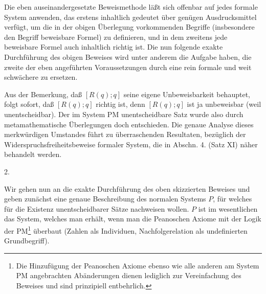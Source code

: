 \documentclass[draft]{scrartcl}
\newcounter{commentaryNumber}
\begin{document}
Die eben auseinandergesetzte Beweismethode läßt sich
offenbar auf jedes formale System anwenden, das erstens 
inhaltlich gedeutet über genügen Ausdrucksmittel
verfügt, um die in der obigen Überlegung vorkommenden
Begriffe (insbesondere den Begriff \glqq beweisbare
Formel\grqq) zu definieren, und in dem zweitens jede
beweisbare Formel auch inhaltlich richtig ist. Die
nun folgende exakte Durchführung des obigen Beweises
wird unter anderem die Aufgabe haben, die zweite der eben
angeführten Voraussetzungen durch eine rein formale und 
weit schwächere zu ersetzen.

Aus der Bemerkung, daß $\left[R\left(q\right); q\right]$ seine 
eigene
Unbeweisbarkeit behauptet, folgt sofort, daß $\left[R\left(q\right); q\right]$ 
richtig ist, denn $\left[R\left(q\right); q\right]$ ist ja unbeweisbar (weil 
unentscheidbar). Der im System PM unentscheidbare Satz
wurde also durch metamathematische Überlegungen doch
entschieden. Die genaue Analyse dieses merkwürdigen 
Umstandes führt zu überraschenden Resultaten, bezüglich der
Widerspruchsfreiheitsbeweise formaler System, die in 
Abschn. 4. (Satz XI) näher behandelt werden.

\begin{center}
2.
\end{center}

Wir gehen nun an die exakte Durchführung des
oben skizzierten Beweises und geben zunächst eine
genaue Beschreibung des normalen Systems $P$, für welches
für die Existenz unentscheidbarer Sätze nachweisen wollen. 
$P$ ist im wesentlichen das System, welches man erhält,
wenn man die Peanoschen Axiome mit der Logik
der PM\footnote{Die Hinzufügung der Peanoschen 
Axiome ebenso wie alle anderen am System PM angebrachten 
Abänderungen dienen lediglich zur Vereinfachung des 
Beweises und sind prinzipiell entbehrlich.}
überbaut (Zahlen als Individuen, Nachfolgerelation
als undefinierten Grundbegriff).
\end{document}
